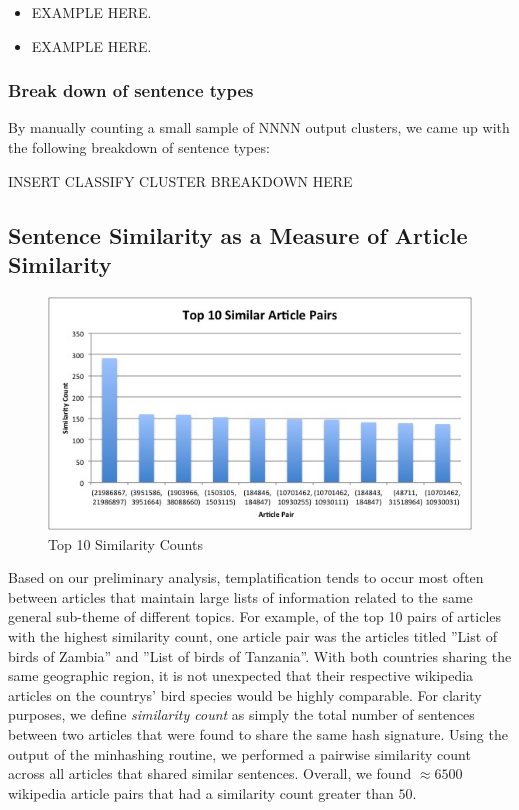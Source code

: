 \documentclass{acm_proc_article-sp}
\begin{document}
\begin{itemize}[noitemsep,nolistsep]
\item EXAMPLE HERE.
\item EXAMPLE HERE.
\end{itemize}

\subsubsection{Break down of sentence types}

By manually counting a small sample of NNNN output clusters, we came up with the following breakdown of sentence types:

INSERT CLASSIFY CLUSTER BREAKDOWN HERE

\subsection{Sentence Similarity as a Measure of Article Similarity}

\begin{figure}
\begin{center}
\includegraphics[scale=0.43, keepaspectratio = true]{Top10ArticlePairs.jpg}
\end{center}
\caption{Top 10 Similarity Counts}
\label{toparticles}
\end{figure}

Based on our preliminary analysis, templatification tends to occur most often between articles that maintain large lists of information related to the same general sub-theme of different topics. For example, of the top 10 pairs of articles with the highest similarity count, one article pair was the articles titled ''List of birds of Zambia'' and ''List of birds of Tanzania''. With both countries sharing the same geographic region, it is not unexpected that their respective wikipedia articles on the countrys' bird species would be highly comparable. For clarity purposes, we define \emph{similarity count} as simply the total number of sentences between two articles that were found to share the same hash signature. Using the output of the minhashing routine, we performed a pairwise similarity count across all articles that shared similar sentences. Overall, we found $\approx 6500$ wikipedia article pairs that had a similarity count greater than $50$.
\end{document}
